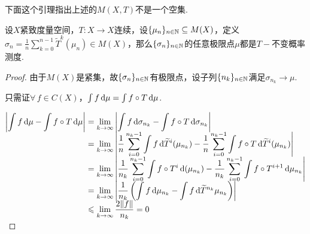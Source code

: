 下面这个引理指出上述的$M(X,T)$不是一个空集.
\begin{lemma}{}
    设$X$紧致度量空间，$T:X\to X$连续，设$\{\mu_n\}_{n\in\mathbb{N}}\subseteq M(X)$，定义$\sigma_n=\frac{1}{n}\sum_{k=0}^{n-1}\widetilde{T}^k(\mu_n)\in M(X)$，那么$\{\sigma_n\}_{n\in\mathbb{N}}$的任意极限点$\mu$都是$T-$不变概率测度.
\end{lemma}
\begin{proof}
    由于$M(X)$是紧集，故$\{\sigma_n\}_{n\in\mathbb{N}}$有极限点，设子列$\{n_k\}_{n\in\mathbb{N}}$满足$\sigma_{n_k}\to \mu$.\par
    只需证$\forall\, f\in C(X)$，$\int f\mathop{}\!\mathrm{d}\mu=\int{f\circ T}\mathop{}\!\mathrm{d}\mu$.\par
    $\setjot[-2]\begin{aligned}[t]
        \left|\int{f}\d\mu-\int{f\circ T}\d\mu\right| &=\lim_{k\to\infty}\left|\int{f}\d\sigma_{n_k}-\int{f\circ T}\d\sigma_{n_k}\right| \\
        &=\lim_{k\to\infty}\left|\frac{1}{n}\sum_{i=0}^{n_k-1}\int{f}\d\widetilde{T}^i(\mu_{n_k})-\frac{1}{n}\sum_{i=0}^{n_k-1}\int{f\circ T}\d\widetilde{T}^i(\mu_{n_k})\right| \\
        &=\lim_{k\to\infty}\left|\frac{1}{n_k}\sum_{i=0}^{n_k-1}\int{f\circ T^i}\d(\mu_{n_k})-\frac{1}{n_k}\sum_{i=0}^{n_k-1}\int{f\circ T^{i+1}}\d\mu_{n_k}\right| \\
        &=\lim_{k\to\infty}\left|\frac{1}{n_k}\left(\int{f}\d\mu_{n_k}-\int{f}\d\widetilde{T}^{n_k}\mu_{n_k}\right)\right| \\
        &\leq \lim_{k\to\infty}\frac{2\|f\|}{n_k}=0
    \end{aligned}$
\end{proof}

